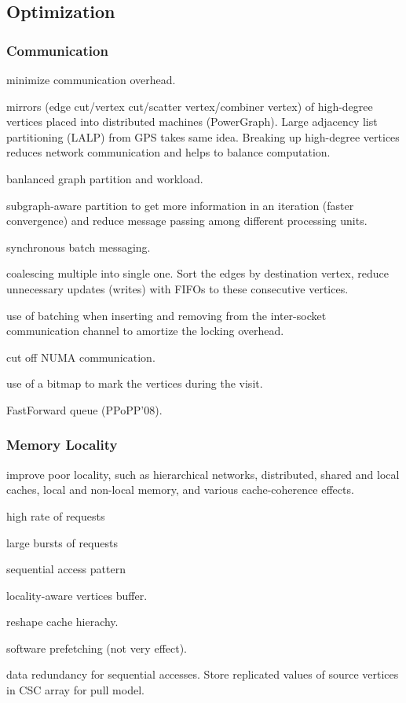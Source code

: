 \documentclass[UTF8,12pt,a4paper]{article}
\begin{document}
\subsection{Optimization}
\subsubsection{Communication}
\begin{compactitem}
  \item minimize communication overhead.
  \item mirrors (edge cut/vertex cut/scatter vertex/combiner vertex)
  of high-degree vertices placed into distributed machines (PowerGraph).
  Large adjacency list partitioning (LALP) from GPS takes same idea.
  Breaking up high-degree vertices reduces network communication
  and helps to balance computation.
  \item banlanced graph partition and workload.
  \item subgraph-aware partition to get more information in an iteration (faster convergence)
  and reduce message passing among different processing units.
  \item synchronous batch messaging.
  \item coalescing multiple into single one.
  Sort the edges by destination vertex,
  reduce unnecessary updates (writes) with FIFOs to these consecutive vertices.
  \item use of batching when inserting and removing
  from the inter-socket communication channel to amortize the locking overhead.
  \item cut off NUMA communication.
  \item use of a bitmap to mark the vertices during the visit.
  \item FastForward queue (PPoPP'08).
\end{compactitem}
\subsubsection{Memory Locality}
\begin{compactitem}
  \item improve poor locality, such as
  hierarchical networks, distributed,
  shared and local caches, local and non-local memory,
  and various cache-coherence effects.
  \item high rate of requests
  \item large bursts of requests
  \item sequential access pattern
  \item locality-aware vertices buffer.
  \item reshape cache hierachy.
  \item software prefetching (not very effect).
  \item data redundancy for sequential accesses.
  Store replicated values of source vertices in CSC array for pull model.
\end{compactitem}
\end{document}
